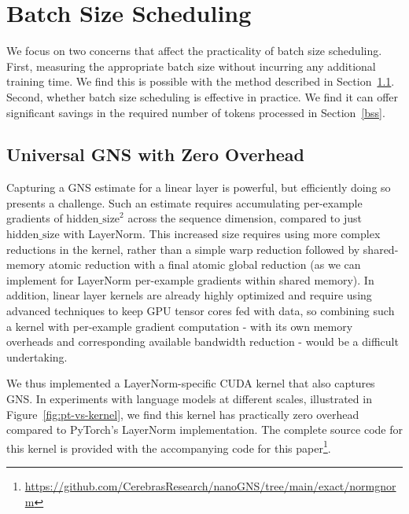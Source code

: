 \documentclass{article}
\begin{document}
\section{Batch Size Scheduling}\label{batch-size}

We focus on two concerns that affect the practicality of batch size scheduling.
First, measuring the appropriate batch size without incurring any additional
training time. We find this is possible with the method described in Section~\ref{universal}.
Second, whether batch size scheduling is effective in practice. We find
it can offer significant savings in the required number of tokens processed
in Section~\ref{bss}.

\subsection{Universal GNS with Zero Overhead}\label{universal}

Capturing a GNS estimate for a linear layer is powerful, but efficiently
doing so presents a challenge. Such an estimate requires accumulating
per-example gradients of $ \text{hidden\_size}^2 $ across the sequence
dimension, compared to just $ \text{hidden\_size} $ with LayerNorm. This
increased size requires using more complex reductions in the kernel, rather than
a simple warp reduction followed by shared-memory atomic reduction with a final
atomic global reduction (as we can implement for LayerNorm per-example gradients
within shared memory). In addition, linear layer kernels are already highly
optimized and require using advanced techniques to keep GPU tensor cores fed
with data, so combining such a kernel with per-example gradient computation
- with its own memory overheads and corresponding available bandwidth reduction
- would be a difficult undertaking.

We thus implemented a LayerNorm-specific CUDA kernel that also captures GNS\@.
In experiments with language models at different scales, illustrated in
Figure~\ref{fig:pt-vs-kernel}, we find this kernel has practically zero
overhead compared to PyTorch's LayerNorm implementation. The complete source
code for this kernel is provided with the accompanying code for this
paper\footnote{\url{https://github.com/CerebrasResearch/nanoGNS/tree/main/exact/normgnorm}}.
\end{document}
